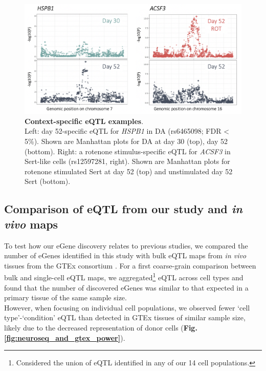 \begin{figure}[h]
\includegraphics[width=16cm]{Chapter5/Fig/neuroseq_eqtl_examples.png}
\caption[Context-specific eQTL examples]{\textbf{Context-specific eQTL examples}.\\
Left: day 52-specific eQTL for \textit{HSPB1} in DA (rs6465098; FDR < 5\%). 
Shown are Manhattan plots for DA at day 30 (top), day 52 (bottom). 
Right: a rotenone stimulus-specific eQTL for \textit{ACSF3} in Sert-like cells (rs12597281, right). 
Shown are Manhattan plots for rotenone stimulated Sert at day 52 (top) and unstimulated day 52 Sert (bottom).}
\label{fig:neuroseq_eqtl_examples}
\end{figure}

\clearpage

\subsection{Comparison of eQTL from our study and \textit{in vivo} maps}

To test how our eGene discovery relates to previous studies, we compared the number of eGenes identified in this study with bulk eQTL maps from \textit{in vivo} tissues from the GTEx consortium \cite{gtex2017genetic}. 
For a first coarse-grain comparison between bulk and single-cell eQTL maps,
we aggregated\footnote{Considered the union of eQTL identified in any of our 14 cell populations.} eQTL across cell types and found that the number of discovered eGenes was similar to that expected in a primary tissue of the same sample size. \\

However, when focusing on individual cell populations, we observed fewer `cell type'-`condition' eQTL than detected in GTEx tissues of similar sample size, likely due to the decreased representation of donor cells (\textbf{Fig. \ref{fig:neuroseq_and_gtex_power}}).\\

